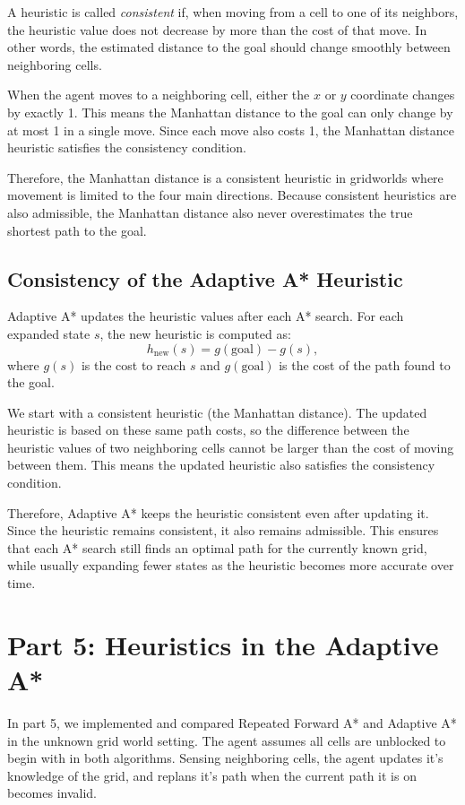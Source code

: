 \documentclass{article}
\begin{document}
A heuristic is called \emph{consistent} if, when moving from a cell to one of its neighbors, the heuristic value does not decrease by more than the cost of that move. In other words, the estimated distance to the goal should change smoothly between neighboring cells.

When the agent moves to a neighboring cell, either the $x$ or $y$ coordinate changes by exactly 1. This means the Manhattan distance to the goal can only change by at most 1 in a single move. Since each move also costs 1, the Manhattan distance heuristic satisfies the consistency condition.

Therefore, the Manhattan distance is a consistent heuristic in gridworlds where movement is limited to the four main directions. Because consistent heuristics are also admissible, the Manhattan distance also never overestimates the true shortest path to the goal.

\subsection{Consistency of the Adaptive A* Heuristic}

Adaptive A* updates the heuristic values after each A* search. For each expanded state $s$, the new heuristic is computed as:
\[
h_{\text{new}}(s) = g(\text{goal}) - g(s),
\]
where $g(s)$ is the cost to reach $s$ and $g(\text{goal})$ is the cost of the path found to the goal.

We start with a consistent heuristic (the Manhattan distance). The updated heuristic is based on these same path costs, so the difference between the heuristic values of two neighboring cells cannot be larger than the cost of moving between them. This means the updated heuristic also satisfies the consistency condition.

Therefore, Adaptive A* keeps the heuristic consistent even after updating it. Since the heuristic remains consistent, it also remains admissible. This ensures that each A* search still finds an optimal path for the currently known grid, while usually expanding fewer states as the heuristic becomes more accurate over time.

\section{Part 5: Heuristics in the Adaptive A*}
In part 5, we implemented and compared Repeated Forward A* and Adaptive A* in the unknown grid world setting. The agent assumes all cells are unblocked to begin with in both algorithms. Sensing neighboring cells, the agent updates it's knowledge of the grid, and replans it's path when the current path it is on becomes invalid.
\end{document}
